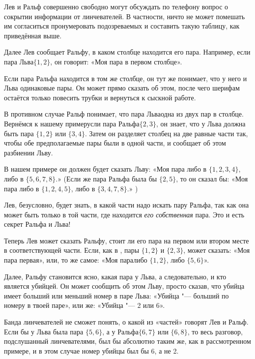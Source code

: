 \documentclass[twoside]{book}
\begin{document}
Лев и Ральф совершенно свободно могут обсуждать по телефону вопрос о сокрытии информации от линчевателей.
В частности, ничто не может помешать им согласиться пронумеровать подозреваемых и составить такую таблицу, как приведённая выше.

Далее Лев сообщает Ральфу, в каком столбце находится его пара.
Например, если пара Льва$\{1,2\}$,  он говорит: «Моя пара в первом столбце». 

Если пара Ральфа находится в том же столбце, он тут же понимает, что у него и Льва одинаковые пары.
Он может прямо сказать об этом, после чего шерифам остаётся только повесить трубки и вернуться к сыскной работе.

В противном случае Ральф понимает, что пара Льваодна из двух пар в столбце.
Вернёмся к нашему примерусли пара Ральфа$\{2,3\}$,  он знает, что у Льва должна быть пара $\{1,2\}$ или $\{3,4\}$.
Затем он разделяет столбец на две равные части так, чтобы обе предполагаемые пары были в одной части, и сообщает об этом разбиении Льву.

В нашем примере он должен будет сказать Льву: «Моя пара либо в $\{1,2,3,4\}$, либо в $\{5,6,7,8\}$.» (Если же пара Ральфа была бы $\{2,5\}$, то он сказал бы: «Моя пара либо в $\{1,2,4,5\}$, либо в $\{3,4,7,8\}$.» )

Лев, безусловно, будет знать, в какой части надо искать пару Ральфа, так как она может быть только в той части, где находится \emph{его собственная} пара.
Это и есть секрет Ральфа и Льва!

Теперь Лев может сказать Ральфу, стоит ли его пара на первом или втором месте в соответствующей части.
Если, как в , пары $\{1,2\}$ и $\{2,3\}$,  может сказать: «Моя пара первая», или, то же самое: «Моя паралибо $\{1,2\}$, либо $\{5,6\}$».

Далее, Ральфу становится ясно, какая пара у Льва, а следовательно, и кто является убийцей.
Он может сообщить об этом Льву, просто сказав, что убийца  имеет больший или меньший номер в паре Льва: «Убийца "--- больший по номеру в твоей паре», или же: «Убийца "--- 2 или 6».

Банда линчевателей не сможет понять, о какой из «частей» говорят Лев и Ральф.
Если бы у Льва была пара $\{5,6\}$, а у Ральфа$\{6,7\}$ или $\{6,8\}$, то весь разговор, подслушанный линчевателями, был бы абсолютно таким же, как в рассмотренном примере, и в этом случае номер убийцы был бы 6, а не 2.
\heart
 
\end{document}
